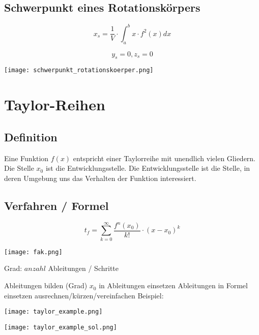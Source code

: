 \begin{multicols*}{3}
    \subsection{Schwerpunkt eines Rotationskörpers}

    \begin{multicols}{2}

        {$$x_s =\frac{1}{V}\cdot \int_{a}^{b}x \cdot f^2(x)dx$$}

        {$$y_s = 0 , z_s = 0$$}

        \columnbreak
        \texttt{[image: schwerpunkt\_rotationskoerper.png]}

    \end{multicols}


    \section{Taylor-Reihen}
    \subsection{Definition}
    {Eine Funktion $f(x)$ entspricht einer Taylorreihe mit unendlich vielen Gliedern. Die Stelle $x_0$ ist die Entwicklungsstelle. Die Entwicklungsstelle ist die Stelle, in deren Umgebung uns das Verhalten der Funktion interessiert.}
    \WhiteSpace
    \subsection{Verfahren / Formel}

    \begin{multicols*}{2}

        $$t_f = \sum_{k = 0}^{ \infty }\frac{f^n(x_0)}{k!}\cdot(x-x_0)^k$$

        \columnbreak
        \texttt{[image: fak.png]} 

    \end{multicols*}  
    {Grad: $anzahl$ Ableitungen / Schritte}

    { Ableitungen bilden (Grad)}
    \WhiteSpace
    { $x_0$ in Ableitungen einsetzen}
    \WhiteSpace
    { Ableitungen in Formel einsetzen}
    \WhiteSpace
    { ausrechnen/kürzen/vereinfachen}
    \WhiteSpace
    {Beispiel:}

    \texttt{[image: taylor\_example.png]}

    \texttt{[image: taylor\_example\_sol.png]}



\end{multicols*}
